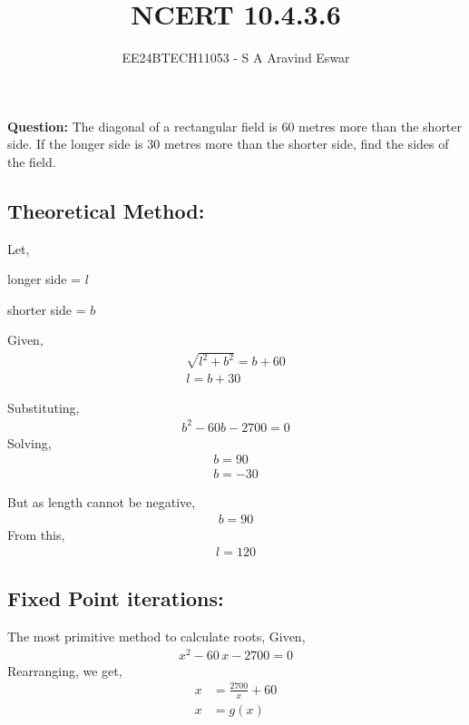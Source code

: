 \documentclass[journal]{IEEEtran}
\begin{document}

\vspace{3cm}

\title{NCERT 10.4.3.6}
\author{EE24BTECH11053 - S A Aravind Eswar}
{\let\newpage\relax\maketitle}

\renewcommand{\thefigure}{\theenumi}
\renewcommand{\thetable}{\theenumi}
\setlength{\intextsep}{10pt} %

\textbf{Question:} The diagonal of a rectangular field is 60 metres more than the shorter side. If the longer side is 30 metres more than the shorter side, find the sides of the field.

\subsection{Theoretical Method: }
    Let,

    longer side = $l$

    shorter side = $b$

    Given,
    \begin{align}
        \sqrt{l^2 + b^2} = b + 60\\
        l = b+30 
    \end{align}

    Substituting,
    \begin{align}
        b^2 - 60b - 2700 = 0
    \end{align}
    Solving,
    \begin{align}
        b = 90\\
        b = -30
    \end{align}
    
    But as length cannot be negative,
    \begin{align}
        b = 90
    \end{align}
    From this,
    \begin{align}
        l = 120
    \end{align}
\subsection{Fixed Point iterations: }
    The most primitive method to calculate roots,
    Given,
    \begin{align}
        x^2 - 60\,x - 2700 = 0
    \end{align}
    Rearranging, we get,
    \begin{align}
        x &= \frac{2700}{x} + 60\\
        x &= g(x)
    \end{align}
\end{document}
